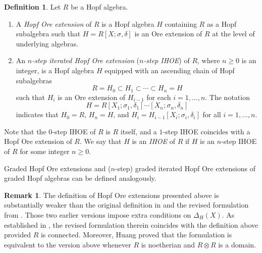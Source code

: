 \documentclass{article}
\theoremstyle{plain}
\theoremstyle{definition}
\newtheorem{definition}[thm]{Definition}
\newtheorem{remark}[thm]{Remark}
\numberwithin{equation}{section}
\begin{document}
	\begin{definition}\label{Hopf Ore extension}
		Let $R$ be a Hopf algebra.
		\begin{enumerate}
			\item A \emph{Hopf Ore extension} of $R$ is a Hopf algebra $H$ containing $R$ as a Hopf subalgebra such that $H=R[X;\sigma,\delta]$ is an Ore extension of $R$ at the level of underlying algebras.
			
			\item An \emph{$n$-step iterated Hopf Ore extension} (\emph{$n$-step IHOE}) of $R$, where $n\geq 0$ is an integer, is a Hopf algebra $H$ equipped with an ascending chain of Hopf subalgebras
			\[
			R=H_{0} \subset H_{1} \subset \cdots \subset H_{n} =H
			\]
			such that $H_{i}$ is an Ore extension of $H_{i-1}$ for each $i=1,\dots, n$. The notation
			\[
			H=R[X_{1};\sigma_{1},\delta_{1}]\cdots [X_{n};\sigma_{n},\delta_{n}]
			\]
			indicates that $H_{0}=R$, $H_{n}=H$, and $H_{i}= H_{i-1}[X_{i};\sigma_{i},\delta_{i}]$ for all $i=1,\dots,n$. 
		\end{enumerate}
		Note that the $0$-step IHOE of $R$ is $R$ itself, and a $1$-step IHOE coincides with a Hopf Ore extension of $R$. We say that $H$ is an \emph{IHOE}  of $R$ if $H$ is an $n$-step IHOE of $R$ for some integer $n\geq 0$.
	\end{definition}
	
	Graded Hopf Ore extensions and ($n$-step) graded iterated Hopf Ore extensions  of graded Hopf algebras can be defined analogously.
	
	\begin{remark}\label{HOE-definition-compare}
		The definition of Hopf Ore extensions presented above is substantially weaker than the original definition in \cite[Definition 1.0]{Pa03} and the revised formulation from \cite[Definition 2.1]{BOZZ15}. Those two earlier versions impose extra conditions on $\Delta_{H}(X)$. As established in \cite[Proposition 2.8]{BOZZ15}, the revised formulation therein coincides with the definition above provided $R$ is connected. Moreover, Huang \cite{Hu20} proved that the formulation \cite[Definition 2.1]{BOZZ15} is equivalent to the version above whenever $R$ is noetherian and $R\otimes R$ is a domain.
	\end{remark}
	
\end{document}

